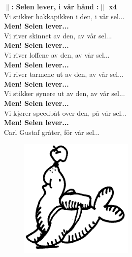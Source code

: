 \documentclass[a6paper,10pt]{article}
\begin{document}
\setlength{\oddsidemargin}{-0.47in}
\begin{center}
\end{center}
\begin{lyrics}
\textbf{$\|$: Selen lever, i vår hånd :$\|$ x4}
\vspace{5pt}\\
Vi stikker hakkapikken i den, i vår sel...
\vspace{5pt}\\
\textbf{Men! Selen lever...}
\vspace{5pt}\\
Vi river skinnet av den, av vår sel...
\vspace{5pt}\\
\textbf{Men! Selen lever...}
\vspace{5pt}\\
Vi river loffene av den, av vår sel...
\vspace{5pt}\\
\textbf{Men! Selen lever...}
\vspace{5pt}\\
Vi river tarmene ut av den, av vår sel...
\vspace{5pt}\\
\textbf{Men! Selen lever...}
\vspace{5pt}\\
Vi stikker øynere ut av den, av vår sel...
\vspace{5pt}\\
\textbf{Men! Selen lever...}
\vspace{5pt}\\
Vi kjører speedbåt over den, på vår sel...
\vspace{5pt}\\
\textbf{Men! Selen lever...}
\vspace{5pt}\\
Carl Gustaf gråter, för vår sel... 
\end{lyrics}
\begin{figure}[!h]
\hfill 
\includegraphics[width=0.5\textwidth]{seal.png}
\end{figure}
\end{document}
